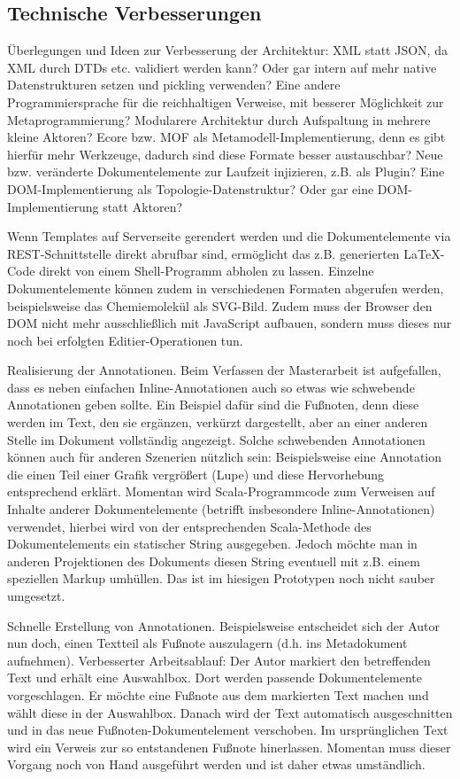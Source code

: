  
\subsection{Technische Verbesserungen}\label{}
 
Überlegungen und Ideen zur Verbesserung der Architektur: XML statt JSON, da XML durch DTDs etc. validiert werden kann? Oder gar intern auf mehr native Datenstrukturen setzen und pickling verwenden? Eine andere Programmiersprache für die reichhaltigen Verweise, mit besserer Möglichkeit zur Metaprogrammierung? Modularere Architektur durch Aufspaltung in mehrere kleine Aktoren? Ecore bzw. MOF als Metamodell-Implementierung, denn es gibt hierfür mehr Werkzeuge, dadurch sind diese Formate besser austauschbar? Neue bzw. veränderte Dokumentelemente zur Laufzeit injizieren, z.B. als Plugin? Eine DOM-Implementierung als Topologie-Datenstruktur? Oder gar eine DOM-Implementierung statt Aktoren?

 
Wenn Templates auf Serverseite gerendert werden und die Dokumentelemente via REST-Schnittstelle direkt abrufbar sind, ermöglicht das z.B. generierten LaTeX-Code direkt von einem Shell-Programm abholen zu lassen. Einzelne Dokumentelemente können zudem in verschiedenen Formaten abgerufen werden, beispielsweise das Chemiemolekül als SVG-Bild. Zudem muss der Browser den DOM nicht mehr ausschließlich mit JavaScript aufbauen, sondern muss dieses nur noch bei erfolgten Editier-Operationen tun.

 
Realisierung der Annotationen. Beim Verfassen der Masterarbeit ist aufgefallen, dass es neben einfachen Inline-Annotationen auch so etwas wie schwebende Annotationen geben sollte. Ein Beispiel dafür sind die Fußnoten, denn diese werden im Text, den sie ergänzen, verkürzt dargestellt, aber an einer anderen Stelle im Dokument vollständig angezeigt. Solche schwebenden Annotationen können auch für anderen Szenerien nützlich sein: Beispielsweise eine Annotation die einen Teil einer Grafik vergrößert (Lupe) und diese Hervorhebung entsprechend erklärt. Momentan wird Scala-Programmcode zum Verweisen auf Inhalte anderer Dokumentelemente (betrifft insbesondere Inline-Annotationen) verwendet, hierbei wird von der entsprechenden Scala-Methode des Dokumentelements ein statischer String ausgegeben. Jedoch möchte man in anderen Projektionen des Dokuments diesen String eventuell mit z.B. einem speziellen Markup umhüllen. Das ist im hiesigen Prototypen noch nicht sauber umgesetzt.

 
Schnelle Erstellung von Annotationen. Beispielsweise entscheidet sich der Autor nun doch, einen Textteil als Fußnote auszulagern (d.h. ins Metadokument aufnehmen). Verbesserter Arbeitsablauf: Der Autor markiert den betreffenden Text und erhält eine Auswahlbox. Dort werden passende Dokumentelemente vorgeschlagen. Er möchte eine Fußnote aus dem markierten Text machen und wählt diese in der Auswahlbox. Danach wird der Text automatisch ausgeschnitten und in das neue Fußnoten-Dokumentelement verschoben. Im ursprünglichen Text wird ein Verweis zur so entstandenen Fußnote hinerlassen. Momentan muss dieser Vorgang noch von Hand ausgeführt werden und ist daher etwas umständlich.

